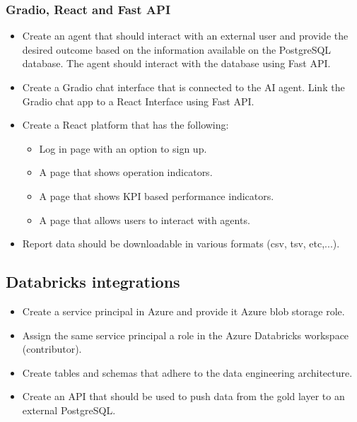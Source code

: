 \documentclass{article}
\begin{document}
 \subsubsection{Gradio, React and Fast API}
    \begin{itemize}
        \item Create an agent that should interact with an external user and provide the desired outcome based on the information available on the PostgreSQL database. The agent should
        interact with the database using Fast API.
        \item Create a Gradio chat interface that is connected to the AI agent. Link the Gradio chat app to a React Interface using Fast API.
        \item Create a React platform that has the following:
            \begin{itemize}
                \item Log in page with an option to sign up.
                \item A page that shows operation indicators.
                \item A page that shows KPI based performance indicators.
                \item A page that allows users to interact with agents.
            \end{itemize}
        \item Report data should be downloadable in various formats (csv, tsv, etc,...).
    \end{itemize}
\subsection{Databricks integrations}
\begin{itemize}
    \item Create a service principal in Azure and provide it Azure blob storage role.
    \item Assign the same service principal a role in the Azure Databricks workspace (contributor).
    \item Create tables and schemas that adhere to the data engineering architecture.
    \item Create an API that should be used to push data from the gold layer to an external PostgreSQL.
\end{itemize}
\end{document}

